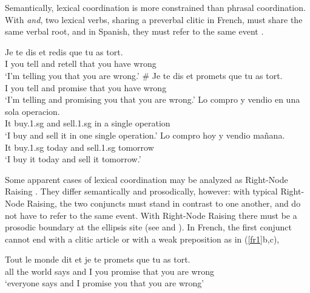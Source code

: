 \documentclass[output=paper]{langsci/langscibook}
\begin{document}
Semantically, lexical coordination is more constrained than phrasal coordination. With \textit{and}, two lexical verbs, sharing a preverbal clitic in French, must share the same verbal root, and in Spanish, they must refer to the same event \citep{Bosque:86}.

\begin{exe}
 \ex
\begin{xlista}
\ex \gll Je te dis et redis que tu {as tort.} \\
I you tell and retell that you have wrong\\
\glt `I'm telling you that you are wrong.'
\ex \gll \# Je te dis et promets que tu as tort.\\
I you tell and promise that you have wrong\\
\glt `I'm telling and promising you that you are wrong.'
\ex \gll Lo compro y vendio en una sola operacion.\\
It buy.1.{\sc sg} and sell.1.{\sc sg} in a single operation\\
\glt `I buy and sell it in one single operation.'
\ex \gll *Lo compro hoy y vendio ma\~{n}ana.\\
It buy.1.{\sc sg} today and sell.1.{\sc sg} tomorrow \\
\glt `I buy it today and sell it tomorrow.'
\end{xlista}
\end{exe}

Some apparent cases of lexical coordination may be analyzed as Right-Node Raising \citep{Beavers}. They differ semantically and prosodically, however: with typical Right-Node Raising, the two conjuncts must stand in contrast to one another, and do not have to refer to the same event. With Right-Node Raising there must be a prosodic boundary at the ellipsis site (see \citet{chavesrnr} and ). In French, the first conjunct cannot end with a clitic article or with a weak preposition as in (\ref{fr1}b,c),

\begin{exe}
 \ex
\begin{xlista}
\ex  \gll Tout le monde dit et je te promets que tu as tort.\\
 all the world says and I you promise that you are wrong\\
\glt `everyone says and I promise you that you are wrong'
\end{xlista}\label{fr1}
\end{exe}
\end{document}
